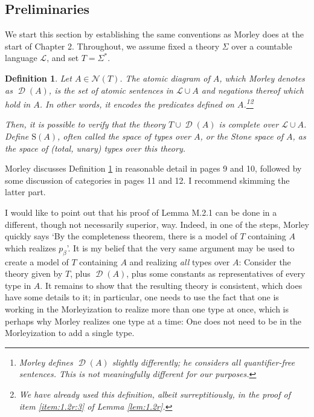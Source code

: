 \documentclass{article}
\newtheorem{definition}[theorem]{Definition}
\theoremstyle{nonumberplain}
\newcommand{\Lang}{\mathcal{L}}
\newcommand{\calN}{\mathcal{N}}
\newcommand{\Stone}{\mathrm{S}}
\DeclareMathOperator{\ADG}{\mathcal{D}}
\begin{document}
\subsection{Preliminaries}

We start this section by establishing the same conventions as Morley does at the start of Chapter 2. Throughout, we assume fixed a theory $\Sigma$ over a countable language $\Lang$, and set $T = \Sigma^*$.

\begin{definition}\label{def:stonespace}
Let $A \in \calN(T)$. The \emph{atomic diagram of $A$}, which Morley denotes as $\ADG(A)$, is the set of atomic sentences in $\Lang \cup A$ and negations thereof which hold in $A$. In other words, it encodes the predicates defined on $A$.\footnote{Morley defines $\ADG(A)$ slightly differently; he considers all quantifier-free sentences. This is not meaningfully different for our purposes.}\footnote{We have already used this definition, albeit surreptitiously, in the proof of item \ref{item:1.2r:3} of Lemma \ref{lem:1.2r}.}

Then, it is possible to verify that the theory $T \cup \ADG(A)$ is complete over $\Lang \cup A$. Define $\Stone(A)$, often called the space of \emph{types over $A$}, or the \emph{Stone space of $A$}, as the space of (total, unary) types over this theory.
\end{definition}

Morley discusses Definition \ref{def:stonespace} in reasonable detail in pages 9 and 10, followed by some discussion of categories in pages 11 and 12. I recommend skimming the latter part.

I would like to point out that his proof of Lemma M.2.1 can be done in a different, though not necessarily superior, way. Indeed, in one of the steps, Morley quickly says `By the completeness theorem, there is a model of $T$ containing $A$ which realizes $p_\beta$'. It is my belief that the very same argument may be used to create a model of $T$ containing $A$ and realizing \emph{all} types over $A$: Consider the theory given by $T$, plus $\ADG(A)$, plus some constants as representatives of every type in $A$. It remains to show that the resulting theory is consistent, which does have some details to it; in particular, one needs to use the fact that one is working in the Morleyization to realize more than one type at once, which is perhaps why Morley realizes one type at a time: One does not need to be in the Morleyization to add a single type.
\end{document}
